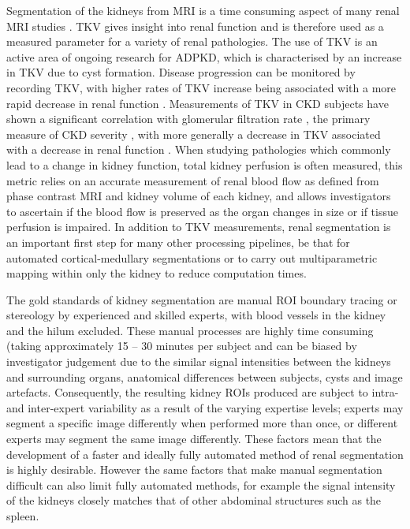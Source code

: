 Segmentation of the kidneys from \ac{MRI} is a time consuming aspect of many renal \ac{MRI} studies \cite{cox_multiparametric_2017, cohen_mri_2009, van_den_dool_functional_2005}. \ac{TKV} gives insight into renal function and is therefore used as a measured parameter for a variety of renal pathologies. The use of \ac{TKV} is an active area of ongoing research for \ac{ADPKD}, which is characterised by an increase in \ac{TKV} due to cyst formation. Disease progression can be monitored by recording \ac{TKV}, with higher rates of \ac{TKV} increase being associated with a more rapid decrease in renal function \cite{chapman_kidney_2012, tangri_total_2017, grantham_volume_2006}. Measurements of \ac{TKV} in \ac{CKD} subjects have shown a significant correlation with glomerular filtration rate \cite{buchanan_quantitative_2019}, the primary measure of \ac{CKD} severity \cite{stevens_assessing_2006}, with more generally a decrease in \ac{TKV} associated with a decrease in renal function \cite{gong_relationship_2012}. When studying pathologies which commonly lead to a change in kidney function, total kidney perfusion is often measured, this metric relies on an accurate measurement of renal blood flow as defined from phase contrast \ac{MRI} \cite{boer_consensus-based_nodate} and kidney volume of each kidney, and allows investigators to ascertain if the blood flow is preserved as the organ changes in size or if tissue perfusion is impaired. In addition to \ac{TKV} measurements, renal segmentation is an important first step for many other processing pipelines, be that for automated cortical-medullary segmentations or to carry out multiparametric mapping within only the kidney to reduce computation times. 

The gold standards of kidney segmentation are manual \ac{ROI} boundary tracing \cite{di_leo_measurement_2011} or stereology \cite{bae_volumetric_2000} by experienced and skilled experts, with blood vessels in the kidney and the hilum excluded. These manual processes are highly time consuming (taking approximately 15 – 30 minutes per subject \cite{zollner_assessment_2012, sharma_kidney_2017, simms_rapid_2019} and can be biased by investigator judgement due to the similar signal intensities between the kidneys and surrounding organs, anatomical differences between subjects, cysts and image artefacts. Consequently, the resulting kidney \ac{ROI}s produced are subject to intra- and inter-expert variability as a result of the varying expertise levels; experts may segment a specific image differently when performed more than once, or different experts may segment the same image differently. These factors mean that the development of a faster and ideally fully automated method of renal segmentation is highly desirable. However the same factors that make manual segmentation difficult can also limit fully automated methods, for example the signal intensity of the kidneys closely matches that of other abdominal structures such as the spleen.


